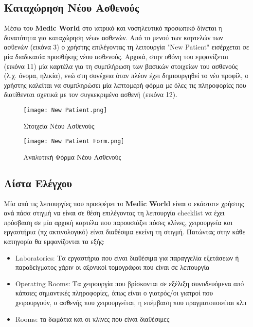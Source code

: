 \documentclass{article}
\begin{document}
\subsection{Καταχώρηση Νέου Ασθενούς}
Μέσω του \textbf{Medic World} στο ιατρικό και νοσηλευτικό προσωπικό δίνεται η δυνατότητα για καταχώρηση νέων ασθενών. Από το μενού των καρτελών των ασθενών (εικόνα 3) ο χρήστης επιλέγοντας τη λειτουργία "New Patient" εισέρχεται σε μία διαδικασία προσθήκης νέου ασθενούς. Αρχικά, στην οθόνη του εμφανίζεται (εικόνα 11) μία καρτέλα για τη συμπλήρωση των βασικών στοιχείων του ασθενούς (λ.χ. όνομα, ηλικία), ενώ στη συνέχεια όταν πλέον έχει δημιουργηθεί το νέο προφίλ, ο χρήστης καλείται να συμπληρώσει μία λεπτομερή φόρμα με όλες τις πληροφορίες που διατίθενται σχετικά με τον συγκεκριμένο ασθενή (εικόνα 12). 

\vspace{0.3cm}

\begin{figure}[!htb]
\centering
\texttt{[image: New Patient.png]}
\caption{\label{fig:new patient} Στοιχεία Νέου Ασθενούς }
\end{figure}

\newpage

\begin{figure}[!htb]
\centering
\texttt{[image: New Patient Form.png]}
\caption{\label{fig:new patient form} Αναλυτική Φόρμα Νέου Ασθενούς}
\end{figure}

\subsection{Λίστα Ελέγχου}

Μία από τις λειτουργίες που προσφέρει το \textbf{Medic World} είναι ο εκάστοτε χρήστης ανά πάσα στιγμή να είναι σε θέση επιλέγοντας τη λειτουργία checklist να έχει πρόσβαση σε μία αρχική καρτέλα που παρουσιάζει πόσες κλίνες, χειρουργεία και εργαστήρια (πχ ακτινολογικό) είναι διαθέσιμα εκείνη τη στιγμή. Πατώντας στην κάθε κατηγορία θα εμφανίζονται τα εξής:

\begin{itemize}
  \item Laboratories: Τα εργαστήρια που είναι διαθέσιμα για παραγγελία εξετάσεων ή παραδείγματος χάριν οι αξονικοί τομογράφοι που είναι σε λειτουργία
  \item Operating Rooms: Τα χειρουργία που βρίσκονται σε εξέλιξη συνοδευόμενα από κάποιες σημαντικές πληροφορίες, όπως είναι ο γιατρός/οι γιατροί που χειρουργούν, ο ασθενής που χειρουργείται, η επέμβαση που πραγματοποιείται κλπ
  \item Rooms: τα δωμάτια και οι κλίνες που είναι διαθέσιμες
\end{itemize}
\end{document}
